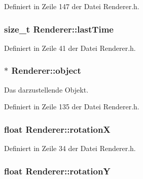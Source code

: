 Definiert in Zeile 147 der Datei Renderer.\-h.

\hypertarget{classRenderer_aab05ebe51ff8677cce3019aa1f4236b1}{
\subsubsection[{last\-Time}]{\setlength{\rightskip}{0pt plus 5cm}size\-\_\-t Renderer\-::last\-Time\hspace{0.3cm}{\ttfamily [private]}}}\label{classRenderer_aab05ebe51ff8677cce3019aa1f4236b1}


Definiert in Zeile 41 der Datei Renderer.\-h.

\hypertarget{classRenderer_a4ad4a42fe6bfd32ff3ef4bb1d59f8f96}{
\subsubsection[{object}]{$\ast$ Renderer\-::object\hspace{0.3cm}{\ttfamily [private]}}}\label{classRenderer_a4ad4a42fe6bfd32ff3ef4bb1d59f8f96}


Das darzustellende Objekt. 



Definiert in Zeile 135 der Datei Renderer.\-h.

\hypertarget{classRenderer_addae66c8c1817bf26fe39f9afebe7388}{
\subsubsection[{rotation\-X}]{\setlength{\rightskip}{0pt plus 5cm}float Renderer\-::rotation\-X}}\label{classRenderer_addae66c8c1817bf26fe39f9afebe7388}


Definiert in Zeile 34 der Datei Renderer.\-h.

\hypertarget{classRenderer_abfbff35deb804df5d19ddb2025b6b0b5}{
\subsubsection[{rotation\-Y}]{\setlength{\rightskip}{0pt plus 5cm}float Renderer\-::rotation\-Y}}\label{classRenderer_abfbff35deb804df5d19ddb2025b6b0b5}


